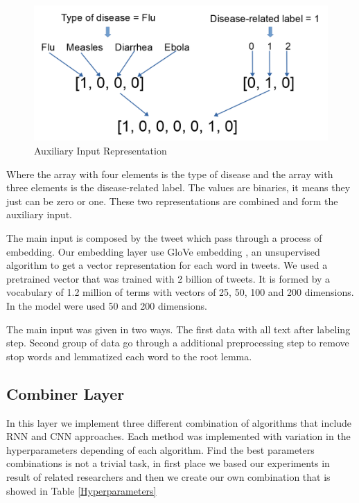 \documentclass[12pt]{report}
\begin{document}
\begin{figure}[H]	
	\centering
	\includegraphics[width=130mm, scale = 1]{images/10_categorical.png}	
	\caption{Auxiliary Input Representation}	
	\label{figure:categorical}
\end{figure}

\noindent Where the array with four elements is the type of disease and the array with three elements is the disease-related label. The values are binaries, it means they just can be zero or one. These two representations are combined and form the auxiliary input.

The main input is composed by the tweet which pass through a process of embedding. Our embedding layer use GloVe embedding \cite{pennington2014}, an unsupervised algorithm to get a vector representation for each word in tweets. We used a pretrained vector that was trained with 2 billion of tweets. It is formed by a vocabulary of 1.2 million of terms with vectors of 25, 50, 100 and 200 dimensions. In the model were used 50 and 200 dimensions.

The main input was given in two ways. The first data with all text after labeling step. Second group of data go through a additional preprocessing step to remove stop words and lemmatized each word to the root lemma.

\subsection{Combiner Layer}

In this layer we implement three different combination of algorithms that include RNN and CNN approaches.  Each method was implemented with variation in the hyperparameters depending of each algorithm.
Find the best parameters combinations is not a trivial task, in first place we based our experiments in result of related researchers and then we create our own combination that is showed in Table \ref{Hyperparameters}
\end{document}
